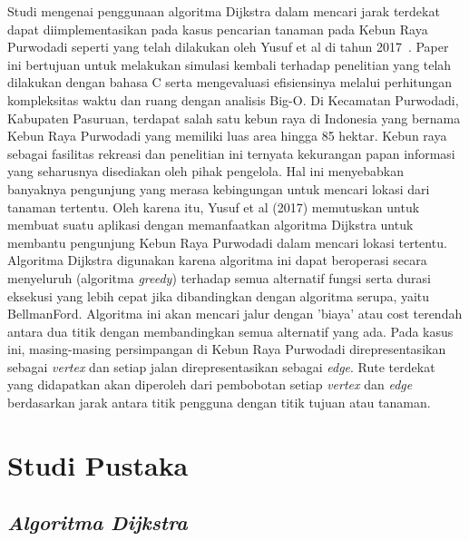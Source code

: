 \documentclass[conference]{IEEEtran}
\begin{document}
Studi mengenai penggunaan algoritma Dijkstra dalam mencari jarak terdekat dapat diimplementasikan pada kasus pencarian tanaman pada Kebun Raya Purwodadi seperti yang telah
dilakukan oleh Yusuf et al di tahun 2017~\cite{yusuf2017implementasi}. Paper ini bertujuan untuk melakukan simulasi kembali terhadap penelitian
yang telah dilakukan dengan bahasa C serta mengevaluasi
efisiensinya melalui perhitungan kompleksitas waktu dan ruang dengan analisis Big-O.
Di Kecamatan Purwodadi, Kabupaten Pasuruan, terdapat
salah satu kebun raya di Indonesia yang bernama Kebun
Raya Purwodadi yang memiliki luas area hingga 85 hektar.
Kebun raya sebagai fasilitas rekreasi dan penelitian ini ternyata
kekurangan papan informasi yang seharusnya disediakan oleh
pihak pengelola. Hal ini menyebabkan banyaknya pengunjung
yang merasa kebingungan untuk mencari lokasi dari tanaman
tertentu. Oleh karena itu, Yusuf et al (2017) memutuskan
untuk membuat suatu aplikasi dengan memanfaatkan algoritma
Dijkstra untuk membantu pengunjung Kebun Raya Purwodadi
dalam mencari lokasi tertentu.
Algoritma Dijkstra digunakan karena algoritma ini dapat
beroperasi secara menyeluruh (algoritma \textit{greedy}) terhadap
semua alternatif fungsi serta durasi eksekusi yang lebih cepat
jika dibandingkan dengan algoritma serupa, yaitu BellmanFord. Algoritma ini akan mencari jalur dengan ’biaya’ atau
cost terendah antara dua titik dengan membandingkan semua
alternatif yang ada.
Pada kasus ini, masing-masing persimpangan di Kebun
Raya Purwodadi direpresentasikan sebagai \textit{vertex} dan setiap
jalan direpresentasikan sebagai \textit{edge}. Rute terdekat yang didapatkan akan diperoleh dari pembobotan setiap \textit{vertex} dan \textit{edge}
berdasarkan jarak antara titik pengguna dengan titik tujuan
atau tanaman.

\section{Studi Pustaka}

\subsection{\textit{Algoritma Dijkstra}}
\end{document}
